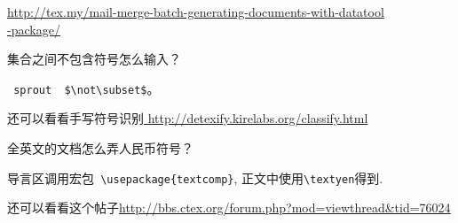 \documentclass[QA.tex]{subfiles}
\begin{document}
 \href{http://tex.my/mail-merge-batch-generating-documents-with-datatool-package/}%
 {http://tex.my/mail-merge-batch-generating-documents-with-datatool\\-package/}

\begin{qst}\label{Q2018010806}
 集合之间不包含符号怎么输入？
\end{qst}
\ans \verb| sprout  $\not\subset$|。

还可以看看手写符号识别\url{ http://detexify.kirelabs.org/classify.html}

\begin{qst}\label{Q2018010807}
全英文的文档怎么弄人民币符号？
\end{qst}
\ans 导言区调用宏包\verb| \usepackage{textcomp}|, 正文中使用\verb|\textyen|得到\textyen.

还可以看看这个帖子\url{http://bbs.ctex.org/forum.php?mod=viewthread&tid=76024}
\end{document}
